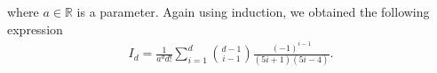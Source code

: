 where $a \in \mathbb{R}$ is a parameter. Again using induction, we obtained the following expression 
\begin{align}
    I_d = \frac{1}{a^{d}d!} \sum_{i = 1}^{d} {d - 1 \choose i - 1}\frac{(-1)^{i - 1}}{(5i + 1)(5i - 4)} .
\end{align}


